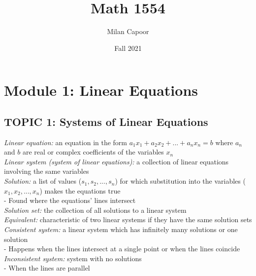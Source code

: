 \documentclass[12pt]{article} %
\title{Math 1554}
\author{Milan Capoor}
\date{Fall 2021} %
\begin{document}
\maketitle

\section{Module 1: Linear Equations}
\subsection{TOPIC 1: Systems of Linear Equations}
\emph{Linear equation:} an equation in the form $a_1 x_1 + a_2 x_2 + ... + a_n x_n = b$ where $a_n$ and $b$ are real or complex coefficients of the variables $x_n$\\

\emph{Linear system (system of linear equations):} a collection of linear equations involving the same variables\\

\emph{Solution:} a list of values ($s_1, s_2, ..., s_n$) for which substitution into the variables 
($x_1, x_2, ... , x_n$) makes the equations true\\
\indent - Found where the equations’ lines intersect \\

\emph{Solution set:} the collection of all solutions to a linear system\\

\emph{Equivalent:} characteristic of two linear systems if they have the same solution sets\\

\emph{Consistent system:} a linear system which has infinitely many solutions or one solution\\
\indent - Happens when the lines intersect at a single point or when the lines coincide\\

\emph{Inconsistent system:} system with no solutions\\
\indent - When the lines are parallel\\
\end{document}
